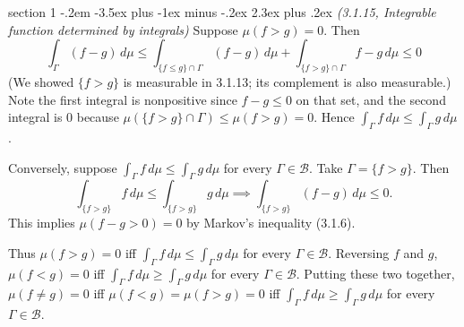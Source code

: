 \documentclass[12pt]{article}
\makeatletter
\theoremstyle{norm}
\providecommand{\cal}[1]{\mathcal{#1}}
\renewcommand{\cal}[1]{\mathcal{#1}}
\newcommand{\Ga}[0]{\Gamma}
\newenvironment{problem}{\@startsection
       {section}
       {1}
       {-.2em}
       {-3.5ex plus -1ex minus -.2ex}
       {2.3ex plus .2ex}
       {\pagebreak[3]%
       \large\bf\noindent{Problem }
       }
       }
       {%
       }
\makeatother
\begin{document}
\begin{problem} {\it (3.1.15, Integrable function determined by integrals)}
Suppose $\mu(f>g)=0$. Then
\[
\int_{\Ga}(f-g)\,d\mu
\le \int_{\{f\le g\}\cap \Ga} (f-g)\,d\mu +\int_{\{f>g\}\cap \Ga}  f-g\,d\mu\le 0
\]
(We showed $\{f>g\}$ is measurable in 3.1.13; its complement is also measurable.) Note the first integral is nonpositive since $f-g\le 0$ on that set, and the second integral is 0 because $\mu(\{f>g\}\cap \Ga)\le \mu(f>g)=0$. Hence $\int_{\Ga}f\,d\mu\leq \int_{\Ga} g\,d\mu$.

Conversely, suppose $\int_{\Ga}f\,d\mu\leq \int_{\Ga} g\,d\mu$ for every $\Ga\in \cal B$. Take $\Ga=\{f>g\}$. Then
\[
\int_{\{f>g\}}f\,d\mu\leq \int_{\{f>g\}} g\,d\mu
\implies
\int_{\{f>g\}}(f-g)\,d\mu\le 0.
\]
This implies $\mu(f-g>0)=0$ by Markov's inequality (3.1.6).

Thus $\mu(f>g)=0$ iff $\int_{\Ga}f\,d\mu\le \int_{\Ga}g\,d\mu$ for every $\Ga\in \cal B$. Reversing $f$ and $g$, $\mu(f<g)=0$ iff $\int_{\Ga}f\,d\mu\ge \int_{\Ga}g\,d\mu$ for every $\Ga\in \cal B$. Putting these two together, $\mu(f\ne g)=0$ iff $\mu(f<g)=\mu(f>g)=0$ iff $\int_{\Ga}f\,d\mu\ge \int_{\Ga}g\,d\mu$ for every $\Ga\in \cal B$.
\end{problem}
\end{document}
